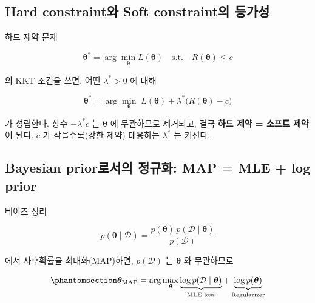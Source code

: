 \documentclass[
  letterpaper,
  DIV=11,
  numbers=noendperiod]{scrreprt}
\begin{document}
\subsection{Hard constraint와 Soft constraint의
등가성}\label{hard-constraintuxc640-soft-constraintuxc758-uxb4f1uxac00uxc131}

하드 제약 문제

\[
\bm{\theta}^* = \arg\min_{\bm{\theta}} L(\bm{\theta}) \quad \text{s.t.}\quad R(\bm{\theta}) \le c
\]

의 KKT 조건을 쓰면, 어떤 \(\lambda^* > 0\) 에 대해

\[
\bm{\theta}^* = \arg\min_{\bm{\theta}} \; L(\bm{\theta}) + \lambda^*\big(R(\bm{\theta}) - c\big)
\]

가 성립한다. 상수 \(-\lambda^* c\) 는 \(\bm{\theta}\) 에 무관하므로
제거되고, 결국 \textbf{하드 제약 = 소프트 제약}이 된다. \(c\) 가
작을수록(강한 제약) 대응하는 \(\lambda^*\) 는 커진다.

\subsection{Bayesian prior로서의 정규화: MAP = MLE + log
prior}\label{bayesian-prioruxb85cuxc11cuxc758-uxc815uxaddcuxd654-map-mle-log-prior}

베이즈 정리

\[
p(\bm{\theta}\mid\mathcal{D}) = \frac{p(\bm{\theta})\,p(\mathcal{D}\mid\bm{\theta})}{p(\mathcal{D})}
\]

에서 사후확률을 최대화(MAP)하면, \(p(\mathcal{D})\) 는 \(\bm{\theta}\)
와 무관하므로

\begin{equation}\protect\phantomsection\label{eq-map}{
\bm{\theta}_{\text{MAP}}
= \arg\max_{\bm{\theta}} \underbrace{\log p(\mathcal{D}\mid\bm{\theta})}_{\text{MLE loss}} + \underbrace{\log p(\bm{\theta})}_{\text{Regularizer}}
}\end{equation}
\end{document}
